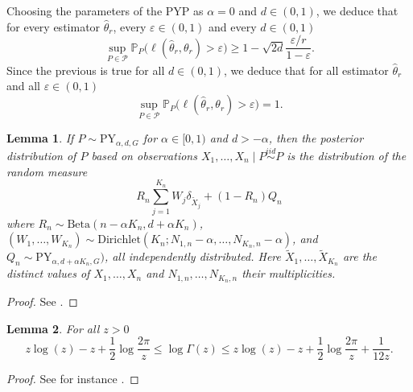 \documentclass{article}
\newtheorem{lemma}{Lemma}
\newcommand{\1}{\boldsymbol{1}}
\newcommand{\PP}{\mathbb{P}}
\newcommand{\distiid}{\overset{iid}{\sim}}
\theoremstyle{plain}
\begin{document}
Choosing the parameters of the PYP as $\alpha = 0$ and $d \in (0,1)$, we deduce that for every estimator $\hat\theta_r$, every $\varepsilon \in (0,1)$ and every $d \in (0,1)$
\begin{equation}
  \label{eq:4ter}
  \sup_{P\in \mathcal{P}}\PP_P\Big( \ell(\hat{\theta}_r,\theta_r) > \varepsilon \Big)%
  \geq 1 - \sqrt{2d} \frac{\varepsilon/r}{1-\varepsilon}.
\end{equation}
Since the previous is true for all $d \in (0,1)$, we deduce that for all estimator $\hat\theta_r$ and all $\varepsilon \in (0,1)$
\begin{equation*}
  \sup_{P\in \mathcal{P}}\PP_P\Big( \ell(\hat{\theta}_r,\theta_r) > \varepsilon \Big) = 1.
\end{equation*}


\begin{lemma}
  \label{lem:4}
  If $P \sim \mathrm{PY}_{\alpha,d,G}$ for $\alpha \in [0,1)$ and $d > -\alpha$, then the posterior distribution of $P$ based on observations $X_1,\dots,X_n \mid P \distiid P$ is the distribution of the random measure
  \begin{equation*}
    R_n\sum_{j=1}^{K_n}W_j\delta_{\tilde{X}_j} + (1 - R_n)Q_n
  \end{equation*}
  where $R_n \sim \mathrm{Beta}(n - \alpha K_n, d + \alpha K_n)$, $(W_1,\dots,W_{K_n}) \sim \mathrm{Dirichlet}(K_n;N_{1,n} - \alpha,\dots,N_{K_n,n}-\alpha)$, and $Q_n \sim \mathrm{PY}_{\alpha,d + \alpha K_n,G})$, all independently distributed. Here $\tilde{X}_1,\dots,\tilde{X}_{K_n}$ are the distinct values of $X_1,\dots,X_n$ and $N_{1,n},\dots,N_{K_n,n}$ their multiplicities.
\end{lemma}
\begin{proof}
  See \cite[Theorem~14.37]{Gho(17)}.
\end{proof}

  \begin{lemma}
    \label{lem:gammaf:ineq}
    For all $z > 0$
  \begin{equation*}
    z\log(z) - z + \frac{1}{2}\log\frac{2\pi}{z}%
    \leq \log\Gamma(z) \leq z\log(z) - z + \frac{1}{2}\log\frac{2\pi}{z}%
    + \frac{1}{12 z}.
  \end{equation*}
\end{lemma}
\begin{proof}
  See for instance \cite[Section~3.6]{Tem(96)}.
\end{proof}
\end{document}
